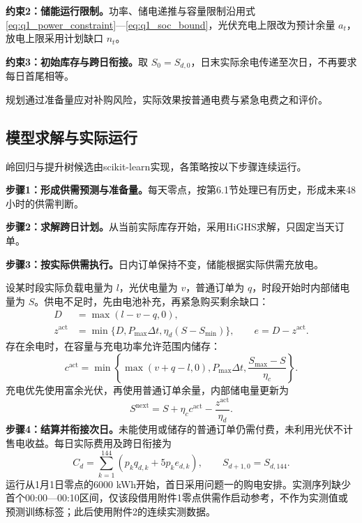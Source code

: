 \noindent\textbf{约束2：储能运行限制。}功率、储电递推与容量限制沿用式\eqref{eq:q1_power_constraint}—\eqref{eq:q1_soc_bound}，光伏充电上限改为预计余量 $a_t$，放电上限采用计划缺口 $n_t$。

\noindent\textbf{约束3：初始库存与跨日衔接。}取 $S_0=S_{d,0}$，日末实际余电传递至次日，不再要求每日首尾相等。

规划通过准备量应对补购风险，实际效果按普通电费与紧急电费之和评价。

\subsection{模型求解与实际运行}
岭回归与提升树候选由scikit-learn实现\cite{pedregosa}，各策略按以下步骤连续运行。

\noindent\textbf{步骤1：形成供需预测与准备量。}每天零点，按第6.1节处理已有历史，形成未来48小时的供需判断。

\noindent\textbf{步骤2：求解跨日计划。}从当前实际库存开始，采用HiGHS求解，只固定当天订单。

\noindent\textbf{步骤3：按实际供需执行。}日内订单保持不变，储能根据实际供需充放电。

设某时段实际负载电量为 $l$，光伏电量为 $v$，普通订单为 $q$，时段开始时内部储电量为 $S$。供电不足时，先由电池补充，再紧急购买剩余缺口：
\begin{align}
D&=\max(l-v-q,0),\label{eq:q2_actual_deficit}\\
z^{\mathrm{act}}&=\min\{D,P_{\max}\Delta t,\eta_d(S-S_{\min})\},\qquad e=D-z^{\mathrm{act}}.\label{eq:q2_emergency}
\end{align}
存在余电时，在容量与充电功率允许范围内储存：
\begin{equation}
c^{\mathrm{act}}=\min\left\{\max(v+q-l,0),P_{\max}\Delta t,\frac{S_{\max}-S}{\eta_c}\right\}.
\label{eq:q2_actual_charge}
\end{equation}
充电优先使用富余光伏，再使用普通订单余量，内部储电量更新为
\begin{equation}
S^{\mathrm{next}}=S+\eta_cc^{\mathrm{act}}-\frac{z^{\mathrm{act}}}{\eta_d}.
\label{eq:q2_actual_soc}
\end{equation}
\noindent\textbf{步骤4：结算并衔接次日。}未能使用或储存的普通订单仍需付费，未利用光伏不计售电收益。每日实际费用及跨日衔接为
\begin{equation}
C_d=\sum_{k=1}^{144}\left(p_kq_{d,k}+5p_ke_{d,k}\right),\qquad S_{d+1,0}=S_{d,144}.
\label{eq:q2_daily_cost}
\end{equation}
运行从1月1日零点的6000 kWh开始，首日采用问题一的购电安排。实测序列缺少首个00:00—00:10区间，仅该段借用附件1零点供需作启动参考，不作为实测值或预测训练标签；此后使用附件2的连续实测数据。

